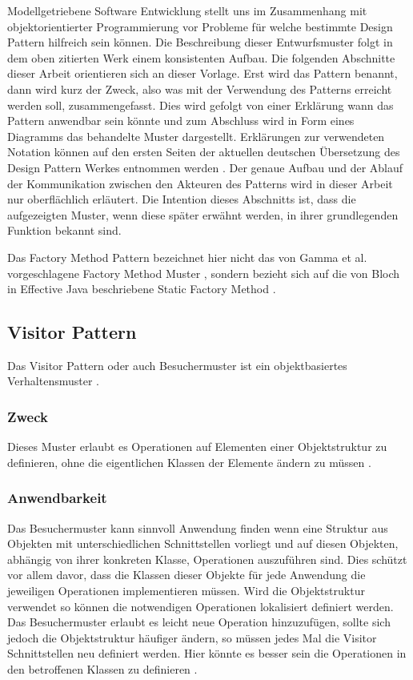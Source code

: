 \documentclass[12pt,oneside,a4paper,parskip]{scrbook}
\begin{document}
Modellgetriebene Software Entwicklung stellt uns im Zusammenhang mit objektorientierter Programmierung vor Probleme für welche bestimmte Design Pattern hilfreich sein können. Die Beschreibung dieser Entwurfsmuster folgt in dem oben zitierten Werk einem konsistenten Aufbau. Die folgenden Abschnitte dieser Arbeit orientieren sich an dieser Vorlage. Erst wird das Pattern benannt, dann wird kurz der Zweck, also was mit der Verwendung des Patterns erreicht werden soll, zusammengefasst. Dies wird gefolgt von einer Erklärung wann das Pattern anwendbar sein könnte und zum Abschluss wird in Form eines Diagramms das behandelte Muster dargestellt. Erklärungen zur verwendeten Notation können auf den ersten Seiten der aktuellen deutschen Übersetzung des Design Pattern Werkes entnommen werden \cite[S. 8]{gamma2015}. Der genaue Aufbau und der Ablauf der Kommunikation zwischen den Akteuren des Patterns wird in dieser Arbeit nur oberflächlich erläutert. Die Intention dieses Abschnitts ist, dass die aufgezeigten Muster, wenn diese später erwähnt werden, in ihrer grundlegenden Funktion bekannt sind.

Das Factory Method Pattern bezeichnet hier nicht das von Gamma et al. vorgeschlagene Factory Method Muster \cite[S. 173ff.]{gamma2015}, sondern bezieht sich auf die von Bloch in Effective Java beschriebene Static Factory Method \cite[S. 5ff.]{bloch2017}.

\subsection{Visitor Pattern}

Das Visitor Pattern oder auch Besuchermuster ist ein objektbasiertes Verhaltensmuster \cite[S. 480]{gamma2015}.

\subsubsection{Zweck}

Dieses Muster erlaubt es Operationen auf Elementen einer Objektstruktur zu definieren, ohne die eigentlichen Klassen der Elemente ändern zu müssen \cite[S. 480]{gamma2015}.

\subsubsection{Anwendbarkeit}

Das Besuchermuster kann sinnvoll Anwendung finden wenn eine Struktur aus Objekten mit unterschiedlichen Schnittstellen vorliegt und auf diesen Objekten, abhängig von ihrer konkreten Klasse, Operationen auszuführen sind. Dies schützt vor allem davor, dass die Klassen dieser Objekte für jede Anwendung die jeweiligen Operationen implementieren müssen. Wird die Objektstruktur verwendet so können die notwendigen Operationen lokalisiert definiert werden. Das Besuchermuster erlaubt es leicht neue Operation hinzuzufügen, sollte sich jedoch die Objektstruktur häufiger ändern, so müssen jedes Mal die Visitor Schnittstellen neu definiert werden. Hier könnte es besser sein die Operationen in den betroffenen Klassen zu definieren \cite[S. 484]{gamma2015}.
\end{document}
